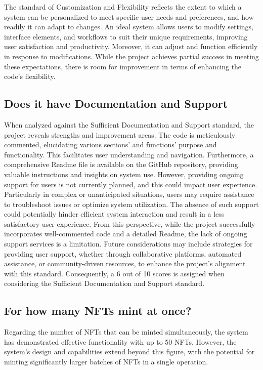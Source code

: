 \documentclass[10pt,twocolumn]{article}
\begin{document}
The standard of Customization and Flexibility reflects the extent to which a system can be personalized to meet specific user needs and preferences, and how readily it can adapt to changes. An ideal system allows users to modify settings, interface elements, and workflows to suit their unique requirements, improving user satisfaction and productivity. Moreover, it can adjust and function efficiently in response to modifications. While the project achieves partial success in meeting these expectations, there is room for improvement in terms of enhancing the code's flexibility.

\subsection{Does it have Documentation and Support}
When analyzed against the Sufficient Documentation and Support standard, the project reveals strengths and improvement areas. The code is meticulously commented, elucidating various sections' and functions' purpose and functionality. This facilitates user understanding and navigation. Furthermore, a comprehensive Readme file is available on the GitHub repository, providing valuable instructions and insights on system use.
However, providing ongoing support for users is not currently planned, and this could impact user experience. Particularly in complex or unanticipated situations, users may require assistance to troubleshoot issues or optimize system utilization. The absence of such support could potentially hinder efficient system interaction and result in a less satisfactory user experience. 
From this perspective, while the project successfully incorporates well-commented code and a detailed Readme, the lack of ongoing support services is a limitation. Future considerations may include strategies for providing user support, whether through collaborative platforms, automated assistance, or community-driven resources, to enhance the project's alignment with this standard. Consequently, a 6 out of 10 scores is assigned when considering the Sufficient Documentation and Support standard.

\subsection{For how many NFTs mint at once?}
Regarding the number of NFTs that can be minted simultaneously, the system has demonstrated effective functionality with up to 50 NFTs. However, the system's design and capabilities extend beyond this figure, with the potential for minting significantly larger batches of NFTs in a single operation.
\end{document}
